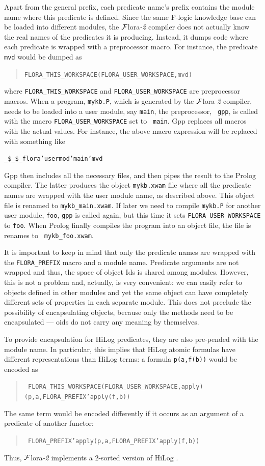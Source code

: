\documentclass[11pt]{article}
\newcommand{\FLORA}{{\mbox{\sc ${\cal F}${lora}\rm\emph{-2}}}\xspace}
\newcommand{\FLSYSTEM}{\FLORA}
\newcommand{\fl}{\mbox{F-logic}\xspace}
\newcommand{\ofile}{xwam}
\begin{document}
{Apart from the general prefix, each predicate name's prefix contains the module
name where this predicate is defined. Since the same \fl knowledge base
can be loaded into different modules, the \FLSYSTEM compiler does not actually
know the real names of the predicates it is producing. Instead, it dumps
code where each predicate is wrapped with a preprocessor macro. For
instance, the predicate {\tt mvd} would be dumped as
\begin{quote}
 \tt FLORA\_THIS\_WORKSPACE(FLORA\_USER\_WORKSPACE,mvd)  
\end{quote}
where {\tt FLORA\_THIS\_WORKSPACE} and {\tt FLORA\_USER\_WORKSPACE} are
preprocessor macros. 
When a program, {\tt mykb.P}, which is generated by the \FLSYSTEM compiler,
needs to be loaded into a user module, say {\tt main}, the preprocessor, {\tt
  gpp}, is called with the macro {\tt FLORA\_USER\_WORKSPACE} set to {\tt
  main}. Gpp replaces all macros with the actual values.
For instance, the above macro expression will be replaced with something like
\begin{alltt}
 \_\$\_\$\_flora'usermod'main'mvd  
\end{alltt}
Gpp then includes all the
necessary files, and then pipes the result to the Prolog compiler. The latter
produces the object {\tt mykb.\ofile} file where all the predicate names are
wrapped with the user module name, as described above.  This object file is
renamed to {\tt mykb\_main.\ofile}. If later we need to compile {\tt mykb.P}
for another user module, {\tt foo}, {\tt gpp} is called again, but this time it
sets {\tt FLORA\_USER\_WORKSPACE} to {\tt foo}. When Prolog finally compiles
the program into an object file, the file is renames to {\tt
  mykb\_foo.\ofile}.

It is important to keep in mind that only the predicate names are wrapped
with the {\tt FLORA\_PREFIX} macro and a module name. Predicate arguments
are not wrapped and thus, the space of object Ids is shared among modules.
However, this is not a problem and, actually, is very convenient: we can
easily refer to objects defined in other modules and yet the same object
can have completely different sets of properties in each separate module.
This does not preclude the possibility of encapsulating objects, because
only the methods need to be encapsulated --- oids do not carry any meaning
by themselves.

To provide encapsulation for HiLog predicates, they are also pre-pended with
the module name. In particular, this implies that HiLog atomic formulas
have different representations than HiLog terms: a formula {\tt p(a,f(b))}
would be encoded as
\begin{quote}
 \tt
 FLORA\_THIS\_WORKSPACE(FLORA\_USER\_WORKSPACE,apply)(p,a,FLORA\_PREFIX'apply(f,b))  
\end{quote}
The same term would be encoded differently if it occurs as an argument of a
predicate of another functor:
\begin{quote}
 \tt
 FLORA\_PREFIX'apply(p,a,FLORA\_PREFIX'apply(f,b))    
\end{quote}
Thus, \FLSYSTEM implements a 2-sorted version of HiLog \cite{hilog-icdt-95}.

}
\end{document}
